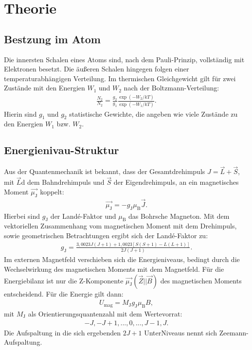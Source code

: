 \section{Theorie}
\label{sec:Theorie}
\subsection{Bestzung im Atom}
Die innersten Schalen eines Atoms sind, nach dem Pauli-Prinzip, vollständig mit Elektronen besetzt.
Die äußeren Schalen hingegen folgen einer temperaturabhängigen Verteilung.
Im thermischen Gleichgewicht gilt für zwei Zustände mit den Energien $W_\mathrm{1}$ und $W_\mathrm{2}$ nach der Boltzmann-Verteilung:
\begin{align}
  \frac{N_2}{N_2}=\frac{g_\mathrm{2}}{g_\mathrm{1}}\frac{\exp(-W_\mathrm{2}/kT)}{\exp(-W_\mathrm{1}/kT)}.
\end{align}
Hierin sind $g_1$ und $g_2$ statistische Gewichte, die angeben wie viele Zustände zu den Energien $W_\mathrm{1}$ bzw. $W_\mathrm{2}$.

\subsection{Energienivau-Struktur}
Aus der Quantenmechanik ist bekannt, dass der Gesamtdrehimpuls $J=\vec{L}+\vec{S}$,
mit $\vec{L}$d dem Bahndrehimpuls und $\vec{S}$ der Eigendrehimpuls, an ein magnetisches Moment $\vec{\mu_\mathrm{J}}$
koppelt:
\begin{align}
  \vec{\mu_\mathrm{J}}=-g_\mathrm{J}\mu_\mathrm{B}\vec{J}.
\end{align}
Hierbei sind $g_\mathrm{J}$ der Landé-Faktor und $\mu_\mathrm{B}$ das Bohrsche Magneton.
Mit dem vektoriellen Zusammenhang vom magnetischen Moment mit dem Drehimpuls, sowie
geometrischen Betrachtungen ergibt sich der Landé-Faktor zu:
\begin{align}
  g_\mathrm{J}=\frac{3,0023J(J+1)+1,0023[S(S+1)-L(L+1)]}{2J(J+1)}.
\end{align}
Im externen Magnetfeld verschieben sich die Energieniveaus, bedingt durch  die Wechselwirkung des magnetischen
Moments mit dem Magnetfeld. Für die Energiebilanz ist nur die Z-Komponente $\vec{\mu_\mathrm{J}}(\vec{Z}||\vec{B})$ des magnetischen Moments
entscheidend.
Für die Energie gilt dann:
\begin{align}
  U_\mathrm{mag}=M_\mathrm{J}g_\mathrm{J}\mu_\mathrm{B}B,
\end{align}
mit $M_\mathrm{J}$ als Orientierungsquantenzahl mit dem Wertevorrat:
\begin{align}
  -J,-J+1,...,0,...,J-1,J.
\end{align}
Die Aufspaltung in die sich ergebenden $2J+1$ UnterNiveaus nennt sich Zeemann-Aufspaltung.

